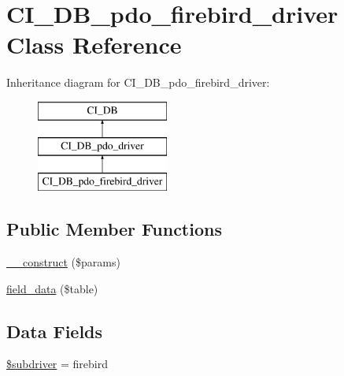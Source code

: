 \hypertarget{class_c_i___d_b__pdo__firebird__driver}{}\section{C\+I\+\_\+\+D\+B\+\_\+pdo\+\_\+firebird\+\_\+driver Class Reference}
\label{class_c_i___d_b__pdo__firebird__driver}
Inheritance diagram for C\+I\+\_\+\+D\+B\+\_\+pdo\+\_\+firebird\+\_\+driver\+:\begin{figure}[H]
\begin{center}
\leavevmode
\includegraphics[height=3.000000cm]{class_c_i___d_b__pdo__firebird__driver}
\end{center}
\end{figure}
\subsection*{Public Member Functions}
\begin{DoxyCompactItemize}
\item 
\mbox{\hyperlink{class_c_i___d_b__pdo__firebird__driver_a9162320adff1a1a4afd7f2372f753a3e}{\+\_\+\+\_\+construct}} (\$params)
\item 
\mbox{\hyperlink{class_c_i___d_b__pdo__firebird__driver_a90355121e1ed009e0efdbd544ab56efa}{field\+\_\+data}} (\$table)
\end{DoxyCompactItemize}
\subsection*{Data Fields}
\begin{DoxyCompactItemize}
\item 
\mbox{\hyperlink{class_c_i___d_b__pdo__firebird__driver_a1322ca756348b11d080cb7a4f590de15}{\$subdriver}} = \textquotesingle{}firebird\textquotesingle{}
\end{DoxyCompactItemize}
